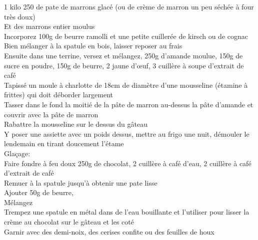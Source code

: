 \begin{minipage}[c]{\textwidth}
1 kilo 250 de pate de marrons glacé (ou de crème de marron un peu séchée à four très doux)\\
Et des marrons entier moulus\\
Incorporez 100g de beurre ramolli et une petite cuillerée de kirsch ou de cognac\\
Bien mélanger à la spatule en bois, laisser reposer au frais\\
Ensuite dans une terrine, versez et mélangez, 250g d'amande moulue, 150g de sucre en poudre, 150g de beurre, 2 jaune d'œuf, 3 cuillère à soupe d'extrait de café\\
Tapissé un moule à charlotte de 18cm de diamètre d'une mousseline (étamine à frittes) qui doit déborder largement\\
Tasser dans le fond la moitié de la pâte de marron au-dessus la pâte d'amande et couvrir avec la pâte de marron\\
Rabattre la mousseline sur le dessus du gâteau\\
Y poser une assiette avec un poids dessus, mettre au frigo une nuit, démouler le lendemain en tirant doucement l'étame\\
Glaçage:\\
    Faire fondre à feu doux 250g de chocolat, 2 cuillère à café d'eau, 2 cuillère à café d'extrait de café\\
    Remuer à la spatule jusqu'à obtenir une pate lisse\\
    Ajouter 50g de beurre,\\
    Mélangez\\
Trempez une spatule en métal dans de l'eau bouillante et l'utiliser pour lisser la crème au chocolat sur le gâteau et les coté\\
Garnir avec des demi-noix, des cerises confite ou des feuilles de houx\\
\\

\end{minipage}

